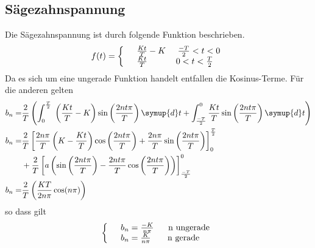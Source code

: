 \subsection{Sägezahnspannung}
\label{sec:Saegezahnspannung}
Die Sägezahnspannung ist durch folgende Funktion beschrieben.
\begin{equation*}
  f(t)=\left\{
  \begin{array}{l l}
    &\frac{Kt}{T}-K   \;\;\;\;\;\frac{-T}{2}<t<0 \\
    &\frac{Kt}{T}   \;\;\;\;\;\;\;\;\;\;\;\;0<t<\frac{T}{2}
  \end{array}
  \right.
\end{equation*}
Da es sich um eine ungerade Funktion handelt entfallen die Kosinus-Terme. Für die
anderen gelten
\begin{align*}
  b_n=&\frac{2}{T}\left(\int^{\frac{T}{2}}_0\;\left(\frac{Kt}{T}-K\right)
  \sin\left(\frac{2nt\pi}{T}\right)\symup{d}t +\int^0_{\frac{-T}{2}}\frac{Kt}{T}
  \sin\left(\frac{2nt\pi}{T}\right)\symup{d}t\right)\\
  b_n=&\frac{2}{T}\left[\frac{2n\pi}{T}\left(K-\frac{Kt}{T}\right)
  \cos\left(\frac{2nt\pi}{T}\right)+\frac{2n\pi}{T}\sin\left(\frac{2nt\pi}{T}\right)
  \right]^{\frac{T}{2}}_0\\
  &+\frac{2}{T}\left[a\left(\sin\left(\frac{2nt\pi}{T}\right)
  -\frac{2nt\pi}{T}\cos\left(\frac{2nt\pi}{T}\right)\right)\right]^0_\frac{-T}{2}\\
  b_n=&\frac{2}{T}\left(\frac{KT}{2n\pi}\cos(n\pi)\right)
\end{align*}
so dass gilt
\begin{equation*}
  \left\{
  \begin{array}{l l}
    &b_n=\frac{-K}{n\pi}   \;\;\;\;\;\;\text{n ungerade} \\
    &b_n=\frac{K}{n\pi}   \;\;\;\;\;\;\;\text{n gerade}
  \end{array}
  \right.
\end{equation*}

